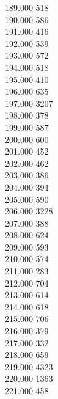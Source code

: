 { 189.000	518 \\
 190.000	586 \\
 191.000	416 \\
 192.000	539 \\
 193.000	572 \\
 194.000	518 \\
 195.000	410 \\
 196.000	635 \\
 197.000	3207 \\
 198.000	378 \\
 199.000	587 \\
 200.000	600 \\
 201.000	452 \\
 202.000	462 \\
 203.000	386 \\
 204.000	394 \\
 205.000	590 \\
 206.000	3228 \\
 207.000	388 \\
 208.000	624 \\
 209.000	593 \\
 210.000	574 \\
 211.000	283 \\
 212.000	704 \\
 213.000	614 \\
 214.000	618 \\
 215.000	706 \\
 216.000	379 \\
 217.000	332 \\
 218.000	659 \\
 219.000	4323 \\
 220.000	1363 \\
 221.000	458 \\
}
